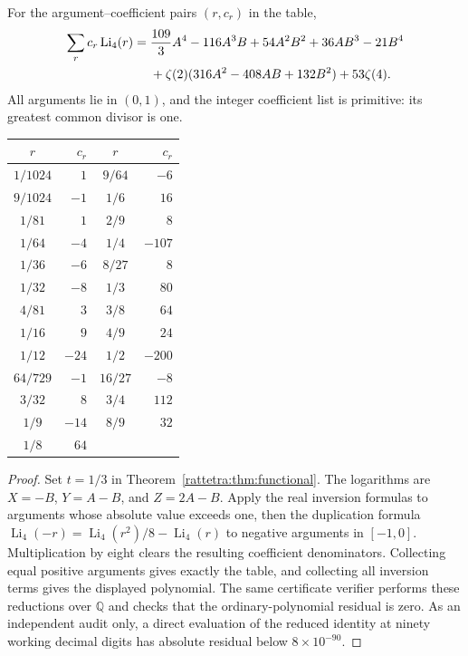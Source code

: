 \begin{corollary}
\label{rattetra:cor:onethird}
For the argument--coefficient pairs $(r,c_r)$ in the table,
\begin{align}
\sum_r c_r\operatorname{Li}_4(r)
={}&\frac{109}{3}A^4-116A^3B+54A^2B^2+36AB^3-21B^4\notag\\
 &+\zeta(2)(316A^2-408AB+132B^2)+53\zeta(4).
\label{rattetra:eq:onethird}
\end{align}
All arguments lie in $(0,1)$, and the integer coefficient list is
primitive: its greatest common divisor is one.

\begin{center}
\renewcommand{\arraystretch}{1.25}
\begin{tabular}{c r@{\qquad\qquad}c r}
\toprule
$r$&$c_r$&$r$&$c_r$\\
\midrule
$1/1024$ & $1$ & $9/64$ & $-6$ \\
$9/1024$ & $-1$ & $1/6$ & $16$ \\
$1/81$ & $1$ & $2/9$ & $8$ \\
$1/64$ & $-4$ & $1/4$ & $-107$ \\
$1/36$ & $-6$ & $8/27$ & $8$ \\
$1/32$ & $-8$ & $1/3$ & $80$ \\
$4/81$ & $3$ & $3/8$ & $64$ \\
$1/16$ & $9$ & $4/9$ & $24$ \\
$1/12$ & $-24$ & $1/2$ & $-200$ \\
$64/729$ & $-1$ & $16/27$ & $-8$ \\
$3/32$ & $8$ & $3/4$ & $112$ \\
$1/9$ & $-14$ & $8/9$ & $32$ \\
$1/8$ & $64$ & & \\
\bottomrule
\end{tabular}
\end{center}
\end{corollary}

\begin{proof}
Set $t=1/3$ in Theorem~\ref{rattetra:thm:functional}. The logarithms
are $X=-B$, $Y=A-B$, and $Z=2A-B$. Apply the real inversion
formulas to arguments whose absolute value exceeds one, then the
duplication formula
$\operatorname{Li}_4(-r)=\operatorname{Li}_4(r^2)/8-
\operatorname{Li}_4(r)$ to negative arguments in $[-1,0]$.
Multiplication by eight clears the resulting coefficient denominators.
Collecting equal positive arguments gives exactly the table, and
collecting all inversion terms gives the displayed polynomial.
The same certificate verifier performs these reductions over
$\mathbb Q$ and checks that the ordinary-polynomial residual is zero.
As an independent audit only, a direct evaluation of the reduced
identity at ninety working decimal digits has absolute residual
below $8\times10^{-90}$.
\end{proof}

